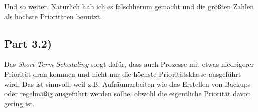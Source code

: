 \documentclass[10pt,a4paper]{article}
\begin{document}
Und so weiter.
Natürlich hab ich es falschherum gemacht und die größten Zahlen als höchste Prioritäten benutzt.

\subsection*{Part 3.2)}

Das \emph{Short-Term Scheduling} sorgt dafür, dass auch Prozesse mit etwas niedrigerer Priorität dran kommen und nicht nur die höchste Prioritätsklasse ausgeführt wird.
Das ist sinnvoll, weil z.B. Aufräumarbeiten wie das Erstellen von Backups oder regelmäßig ausgeführt werden sollte, obwohl die eigentliche Priorität davon gering ist.
\end{document}
